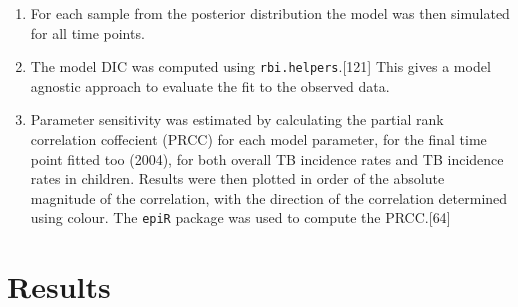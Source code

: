 \documentclass[11pt,twoside]{bristolthesis}
\begin{document}
\begin{enumerate}
  \item
    For each sample from the posterior distribution the model was then simulated for all time points.
  \item
    The model DIC was computed using \texttt{rbi.helpers}.{[}121{]} This gives a model agnostic approach to evaluate the fit to the observed data.
  \item
    Parameter sensitivity was estimated by calculating the partial rank correlation coffecient (PRCC) for each model parameter, for the final time point fitted too (2004), for both overall TB incidence rates and TB incidence rates in children. Results were then plotted in order of the absolute magnitude of the correlation, with the direction of the correlation determined using colour. The \texttt{epiR} package was used to compute the PRCC.{[}64{]}
  \end{enumerate}
  \hypertarget{results-3}{%
  \section{Results}\label{results-3}}
  
\end{document}
